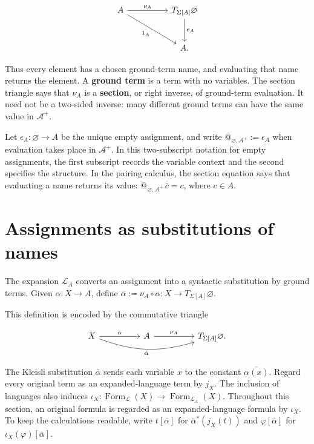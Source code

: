 \documentclass[11pt]{article}
\makeatletter
\newcommand{\atsign}{\mathord{@}}
\theoremstyle{definition}
\makeatother
\begin{document}
\[
\begin{tikzcd}[row sep=large,column sep=huge]
A \arrow[r,"\nu_A"] \arrow[dr,"1_A"'] &
T_{\Sigma[A]}\varnothing \arrow[d,"e_A"] \\
& A.
\end{tikzcd}
\]

Thus every element has a chosen ground-term name, and evaluating that
name returns the element. A \textbf{ground term} is a term with no
variables. The section triangle says that \(\nu_A\) is a
\textbf{section}, or right inverse, of ground-term evaluation. It need
not be a two-sided inverse: many different ground terms can have the
same value in \(\mathcal A^+\).

Let \(\epsilon_A:\varnothing\to A\) be the unique empty assignment, and
write \(\atsign_{\varnothing,\mathcal A^+}:=\epsilon_A\) when evaluation
takes place in \(\mathcal A^+\). In this two-subscript notation for empty
assignments, the first subscript records the variable context and the second
specifies the structure. In the pairing calculus, the section equation says that
evaluating a name returns its value:
\(\atsign_{\varnothing,\mathcal A^+}\,\bar c=c\), where \(c\in A\).

\section{Assignments as substitutions of
names}\label{assignments-as-substitutions-of-names}

The expansion \(\mathcal L_A\) converts an assignment into a syntactic
substitution by ground terms. Given \(\alpha:X\to A\), define
\(\bar\alpha:=\nu_A\circ\alpha:X\to T_{\Sigma[A]}\varnothing\).

This definition is encoded by the commutative triangle

\[
\begin{tikzcd}[column sep=huge]
X \arrow[r,"\alpha"]
  \arrow[rr,bend right=18,"\bar\alpha"'] &
A \arrow[r,"\nu_A"] & T_{\Sigma[A]}\varnothing.
\end{tikzcd}
\]

The Kleisli substitution \(\bar\alpha\) sends each variable \(x\) to the
constant \(\overline{\alpha(x)}\). Regard every
original term as an expanded-language term by \(j_X\). The inclusion of
languages also induces
\(\iota_X:\operatorname{Form}_{\mathcal L}(X)\to
\operatorname{Form}_{\mathcal L_A}(X)\). Throughout this section, an original
formula is regarded as an expanded-language formula by \(\iota_X\). To keep the calculations readable,
write \(t[\bar\alpha]\) for \(\bar\alpha^*(j_X(t))\) and
\(\varphi[\bar\alpha]\) for
\(\iota_X(\varphi)[\bar\alpha]\).
\end{document}
